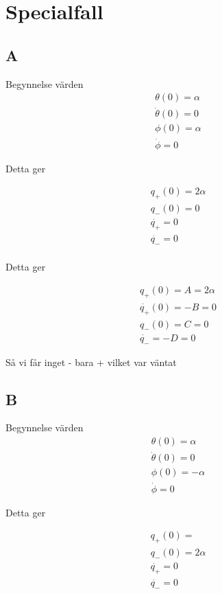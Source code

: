 \documentclass[a4paper]{article}
\begin{document}
\section{Specialfall}

\subsection*{A}

Begynnelse värden
\begin{align}
    \theta(0) = \alpha\\
    \dot{\theta}(0) = 0 \\
    \phi(0) = \alpha \\
    \dot{\phi} = 0
\end{align}

Detta ger

\begin{align}
    q_+(0) = 2 \alpha \\
    q_-(0) = 0 \\
    \dot{q_+} = 0 \\
    \dot{q_-} = 0 \\
\end{align}

Detta ger

\begin{align}
    q_+(0) = A = 2 \alpha \\
    \dot{q_+}(0) = -B = 0 \\
    q_-(0) = C = 0 \\
    \dot{q_-} = -D = 0
\end{align}

Så vi får inget - bara + vilket var väntat

\subsection*{B}
Begynnelse värden
\begin{align}
    \theta(0) = \alpha\\
    \dot{\theta}(0) = 0 \\
    \phi(0) = -\alpha \\
    \dot{\phi} = 0
\end{align}

Detta ger

\begin{align}
    q_+(0) =  \\
    q_-(0) = 2 \alpha \\
    \dot{q_+} = 0 \\
    \dot{q_-} = 0 \\
\end{align}
\end{document}

